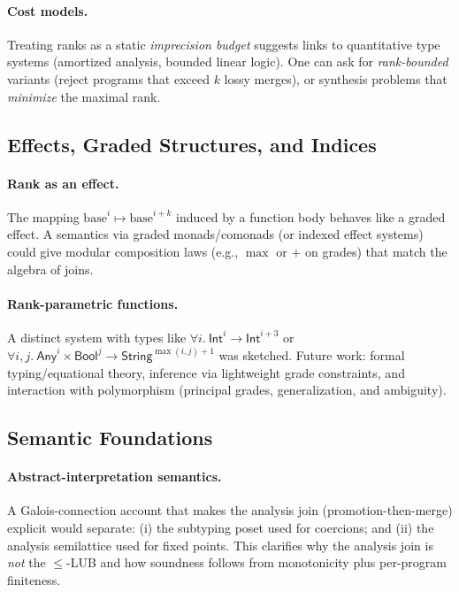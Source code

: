 \paragraph{Cost models.}
Treating ranks as a static \emph{imprecision budget} suggests links to quantitative type systems (amortized analysis, bounded linear logic).
One can ask for \emph{rank-bounded} variants (reject programs that exceed $k$ lossy merges), or synthesis problems that \emph{minimize} the maximal rank.

\subsection{Effects, Graded Structures, and Indices}
\paragraph{Rank as an effect.}
The mapping $\text{base}^i \mapsto \text{base}^{i+k}$ induced by a function body behaves like a graded effect.
A semantics via graded monads/comonads (or indexed effect systems) could give modular composition laws (e.g., $\max$ or $+$ on grades) that match the algebra of joins.

\paragraph{Rank-parametric functions.}
A distinct system with types like $\forall i.\ \textsf{Int}^i \to \textsf{Int}^{i+3}$ or $\forall i,j.\ \textsf{Any}^i \times \textsf{Bool}^j \to \textsf{String}^{\max(i,j)+1}$ was sketched.
Future work: formal typing/equational theory, inference via lightweight grade constraints, and interaction with polymorphism (principal grades, generalization, and ambiguity).

\subsection{Semantic Foundations}
\paragraph{Abstract-interpretation semantics.}
A Galois-connection account that makes the analysis join (promotion-then-merge) explicit would separate:
(i) the subtyping poset used for coercions; and
(ii) the analysis semilattice used for fixed points.
This clarifies why the analysis join is \emph{not} the $\le$-LUB and how soundness follows from monotonicity plus per-program finiteness.

